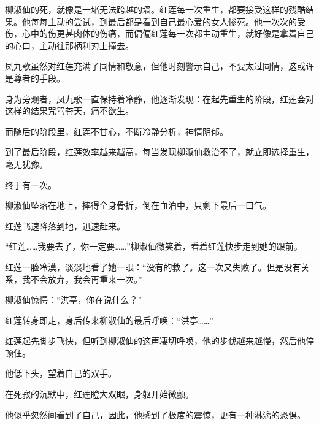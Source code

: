 \begin{this_body}
柳淑仙的死，就像是一堵无法跨越的墙。红莲每一次重生，都要接受这样的残酷结果。他每每主动的尝试，到最后都是看到自己最心爱的女人惨死。他一次次的受伤，心中的伤更甚肉体的伤痛，而偏偏红莲每一次都主动重生，就好像是拿着自己的心口，主动往那柄利刃上撞去。

凤九歌虽然对红莲充满了同情和敬意，但他时刻警示自己，不要太过同情，这或许是尊者的手段。

身为旁观者，凤九歌一直保持着冷静，他逐渐发现：在起先重生的阶段，红莲会对这样的结果咒骂苍天，痛不欲生。

而随后的阶段里，红莲不甘心，不断冷静分析，神情阴郁。

到了最后阶段，红莲效率越来越高，每当发现柳淑仙救治不了，就立即选择重生，毫无犹豫。

终于有一次。

柳淑仙坠落在地上，摔得全身骨折，倒在血泊中，只剩下最后一口气。

红莲飞速降落到地，迅速赶来。

“红莲……我要去了，你一定要……”柳淑仙微笑着，看着红莲快步走到她的跟前。

红莲一脸冷漠，淡淡地看了她一眼：“没有的救了。这一次又失败了。但是没有关系，我不会放弃，我会再重来一次。”

柳淑仙惊愕：“洪亭，你在说什么？”

红莲转身即走，身后传来柳淑仙的最后呼唤：“洪亭……”

红莲起先脚步飞快，但听到柳淑仙的这声凄切呼唤，他的步伐越来越慢，然后他停顿住。

他低下头，望着自己的双手。

在死寂的沉默中，红莲瞪大双眼，身躯开始微颤。

他似乎忽然间看到了自己，因此，他感到了极度的震惊，更有一种淋漓的恐惧。

\end{this_body}

